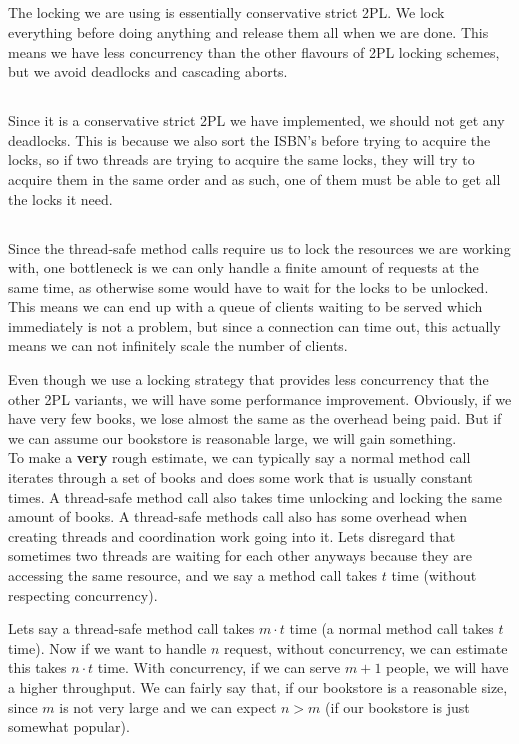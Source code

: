 \documentclass[a4paper]{article}
\begin{document}
\subsection{}
The locking we are using is essentially conservative strict 2PL. We lock everything before doing anything and release them all when we are done. This means we have less concurrency than the other flavours of 2PL locking schemes, but we avoid deadlocks and cascading aborts.

\subsection{}
Since it is a conservative strict 2PL we have implemented, we should not get any deadlocks. This is because we also sort the ISBN's before trying to acquire the locks, so if two threads are trying to acquire the same locks, they will try to acquire them in the same order and as such, one of them must be able to get all the locks it need.

\subsection{}
Since the thread-safe method calls require us to lock the resources we are working with, one bottleneck is we can only handle a finite amount of requests at the same time, as otherwise some would have to wait for the locks to be unlocked. This means we can end up with a queue of clients waiting to be served which immediately is not a problem, but since a connection can time out, this actually means we can not infinitely scale the number of clients.


Even though we use a locking strategy that provides less concurrency that the other 2PL variants, we will have some performance improvement. Obviously, if we have very few books, we lose almost the same as the overhead being paid. But if we can assume our bookstore is reasonable large, we will gain something. \\
To make a \textbf{very} rough estimate, we can typically say a normal method call iterates through a set of books and does some work that is usually constant times. A thread-safe method call also takes time unlocking and locking the same amount of books. A thread-safe methods call also has some overhead when creating threads and coordination work going into it. Lets disregard that sometimes two threads are waiting for each other anyways because they are accessing the same resource, and we say a method call takes $t$ time (without respecting concurrency).

Lets say a thread-safe method call takes $m\cdot t$ time (a normal method call takes $t$ time). Now if we want to handle $n$ request, without concurrency, we can estimate this takes $n\cdot t$ time. With concurrency, if we can serve $m+1$ people, we will have a higher throughput. We can fairly say that, if our bookstore is a reasonable size, since $m$ is not very large and we can expect $n>m$ (if our bookstore is just somewhat popular).
\end{document}
